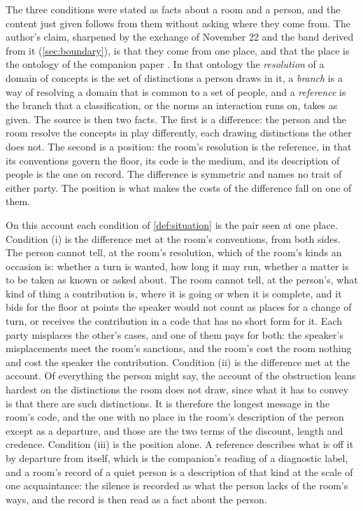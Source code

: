 The three conditions were stated as facts about a room and a person, and the content just given follows from them without asking where they come from. The author's claim, sharpened by the exchange of November 22 and the band derived from it (\autoref{sec:boundary}), is that they come from one place, and that the place is the ontology of the companion paper \cite{NormCost}. In that ontology the \emph{resolution} of a domain of concepts is the set of distinctions a person draws in it, a \emph{branch} is a way of resolving a domain that is common to a set of people, and a \emph{reference} is the branch that a classification, or the norms an interaction runs on, takes as given. The source is then two facts. The first is a difference: the person and the room resolve the concepts in play differently, each drawing distinctions the other does not. The second is a position: the room's resolution is the reference, in that its conventions govern the floor, its code is the medium, and its description of people is the one on record. The difference is symmetric and names no trait of either party. The position is what makes the costs of the difference fall on one of them.

On this account each condition of \autoref{def:situation} is the pair seen at one place. Condition (i) is the difference met at the room's conventions, from both sides. The person cannot tell, at the room's resolution, which of the room's kinds an occasion is: whether a turn is wanted, how long it may run, whether a matter is to be taken as known or asked about. The room cannot tell, at the person's, what kind of thing a contribution is, where it is going or when it is complete, and it bids for the floor at points the speaker would not count as places for a change of turn, or receives the contribution in a code that has no short form for it. Each party misplaces the other's cases, and one of them pays for both: the speaker's misplacements meet the room's sanctions, and the room's cost the room nothing and cost the speaker the contribution. Condition (ii) is the difference met at the account. Of everything the person might say, the account of the obstruction leans hardest on the distinctions the room does not draw, since what it has to convey is that there are such distinctions. It is therefore the longest message in the room's code, and the one with no place in the room's description of the person except as a departure, and those are the two terms of the discount, length and credence. Condition (iii) is the position alone. A reference describes what is off it by departure from itself, which is the companion's reading of a diagnostic label, and a room's record of a quiet person is a description of that kind at the scale of one acquaintance: the silence is recorded as what the person lacks of the room's ways, and the record is then read as a fact about the person.

